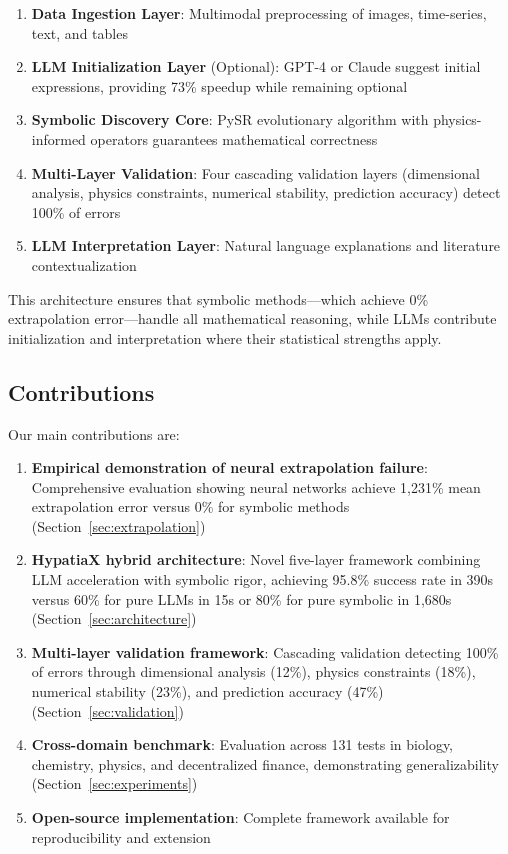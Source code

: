 \documentclass[twoside,11pt]{article}
\begin{document}
\begin{enumerate}
\item \textbf{Data Ingestion Layer}: Multimodal preprocessing of images, time-series, text, and tables
\item \textbf{LLM Initialization Layer} (Optional): GPT-4 or Claude suggest initial expressions, providing 73\% speedup while remaining optional
\item \textbf{Symbolic Discovery Core}: PySR evolutionary algorithm with physics-informed operators guarantees mathematical correctness
\item \textbf{Multi-Layer Validation}: Four cascading validation layers (dimensional analysis, physics constraints, numerical stability, prediction accuracy) detect 100\% of errors
\item \textbf{LLM Interpretation Layer}: Natural language explanations and literature contextualization
\end{enumerate}

This architecture ensures that symbolic methods---which achieve 0\% extrapolation error---handle all mathematical reasoning, while LLMs contribute initialization and interpretation where their statistical strengths apply.

\subsection{Contributions}

Our main contributions are:

\begin{enumerate}
\item \textbf{Empirical demonstration of neural extrapolation failure}: Comprehensive evaluation showing neural networks achieve 1,231\% mean extrapolation error versus 0\% for symbolic methods (Section~\ref{sec:extrapolation})

\item \textbf{HypatiaX hybrid architecture}: Novel five-layer framework combining LLM acceleration with symbolic rigor, achieving 95.8\% success rate in 390s versus 60\% for pure LLMs in 15s or 80\% for pure symbolic in 1,680s (Section~\ref{sec:architecture})

\item \textbf{Multi-layer validation framework}: Cascading validation detecting 100\% of errors through dimensional analysis (12\%), physics constraints (18\%), numerical stability (23\%), and prediction accuracy (47\%) (Section~\ref{sec:validation})

\item \textbf{Cross-domain benchmark}: Evaluation across 131 tests in biology, chemistry, physics, and decentralized finance, demonstrating generalizability (Section~\ref{sec:experiments})

\item \textbf{Open-source implementation}: Complete framework available for reproducibility and extension
\end{enumerate}
\end{document}
